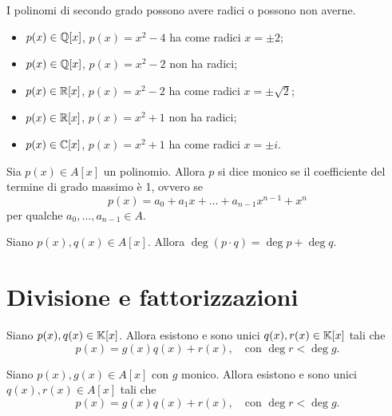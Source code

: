 \begin{remark}
    I polinomi di secondo grado possono avere radici o possono non averne.
    \begin{itemize}
        \item $p(x) \in \mathbb{Q}[x]$, $p(x) = x^2 - 4$ ha come radici $x = \pm 2$;
        \item $p(x) \in \mathbb{Q}[x]$, $p(x) = x^2 - 2$ non ha radici;
        \item $p(x) \in \mathbb{R}[x]$, $p(x) = x^2 - 2$ ha come radici $x = \pm \sqrt{2}$;
        \item $p(x) \in \mathbb{R}[x]$, $p(x) = x^2 + 1$ non ha radici;        \item $p(x) \in \mathbb{C}[x]$, $p(x) = x^2 + 1$ ha come radici $x = \pm i$.
    \end{itemize}
\end{remark}

\begin{definition}
    Sia $p(x) \in A[x]$ un polinomio. Allora $p$ si dice monico se il coefficiente del termine di grado massimo è 1, ovvero se \[
        p(x) = a_0 + a_1x + \dots + a_{n-1}x^{n-1} + x^n    
    \] per qualche $a_0, \dots, a_{n-1} \in A$.
\end{definition}

\begin{proposition}\label{grado_prodotto_somma_gradi}
    Siano $p(x), q(x) \in A[x]$. Allora $\deg (p \cdot q) = \deg p + \deg q$.
\end{proposition}

\section{Divisione e fattorizzazioni}

\begin{theorem}
    Siano $p(x), q(x) \in \mathbb{K}[x]$. Allora esistono e sono unici $q(x), r(x) \in \mathbb{K}[x]$ tali che \begin{equation}
        p(x) = g(x)q(x) + r(x), \quad \text{con } \deg r < \deg g.
    \end{equation} 
\end{theorem}

\begin{proposition}\label{divisione_polinomi}
    Siano $p(x), g(x) \in A[x]$ con $g$ monico. Allora esistono e sono unici $q(x), r(x) \in A[x]$ tali che \begin{equation}
        p(x) = g(x)q(x) + r(x), \quad \text{con } \deg r < \deg g.
    \end{equation} 
\end{proposition}

